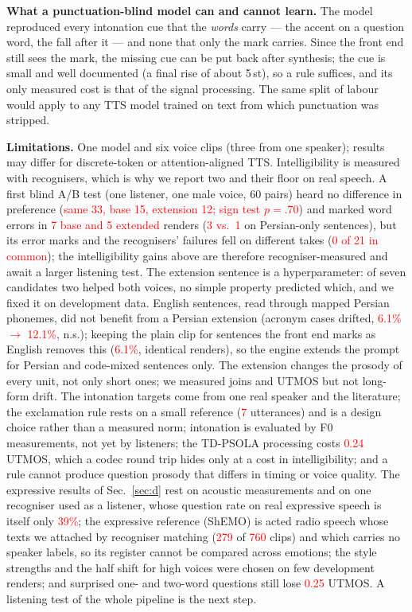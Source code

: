 \documentclass[conference]{IEEEtran}
\newcommand{\RES}[1]{\textcolor{red}{#1}}
\begin{document}
\textbf{What a punctuation-blind model can and cannot learn.} The model reproduced every intonation cue
that the \emph{words} carry --- the accent on a question word, the fall after it --- and none that only the
mark carries. Since the front end still sees the mark, the missing cue can be put back after synthesis;
the cue is small and well documented (a final rise of about 5\,st), so a rule suffices, and its only
measured cost is that of the signal processing. The same split of labour would apply to any TTS model
trained on text from which punctuation was stripped.

\textbf{Limitations.} One model and six voice clips (three from one speaker); results may differ for discrete-token or
attention-aligned TTS. Intelligibility is measured with recognisers, which is why we report two and their
floor on real speech. A first blind A/B test (one listener, one male voice, 60 pairs) heard no difference
in preference (\RES{same 33, base 15, extension 12; sign test $p=.70$}) and marked word errors in \RES{7 base
and 5 extended} renders (\RES{3 vs.\ 1} on Persian-only sentences), but its error marks and the
recognisers' failures fell on different takes (\RES{0 of 21 in common}); the intelligibility gains above
are therefore recogniser-measured and await a larger listening test. The
extension sentence is a hyperparameter: of seven candidates two helped both voices, no simple property
predicted which, and we fixed it on development data. English sentences, read through mapped Persian phonemes, did not benefit from a Persian
extension (acronym cases drifted, \RES{6.1\% $\to$ 12.1\%}, n.s.); keeping the plain clip for sentences the
front end marks as English removes this (\RES{6.1\%}, identical renders), so the engine extends the prompt
for Persian and code-mixed sentences only. The extension changes the prosody of every unit, not only short
ones; we measured joins and UTMOS but not long-form drift. The intonation targets come from one real
speaker and the literature; the exclamation rule rests on a small reference (\RES{7} utterances) and is a
design choice rather than a measured norm; intonation is evaluated by F0 measurements, not yet by
listeners; the TD-PSOLA processing costs \RES{0.24} UTMOS, which a codec round trip hides only at a cost in
intelligibility; and a rule cannot produce question prosody that differs in timing or voice quality.
The expressive results of Sec.~\ref{sec:d} rest on acoustic measurements and on one recogniser used as a
listener, whose question rate on real expressive speech is itself only \RES{39\%}; the expressive reference
(ShEMO) is acted radio speech whose texts we attached by recogniser matching (\RES{279} of \RES{760} clips)
and which carries no speaker labels, so its register cannot be compared across emotions; the style
strengths and the half shift for high voices were chosen on few development renders; and surprised one- and
two-word questions still lose \RES{0.25} UTMOS. A listening test of the whole pipeline is the next step.
\end{document}
